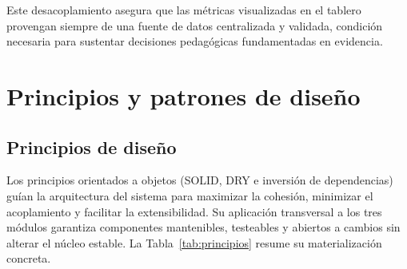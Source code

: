 Este desacoplamiento asegura que las métricas visualizadas en el tablero provengan
siempre de una fuente de datos centralizada y validada, condición necesaria para
sustentar decisiones pedagógicas fundamentadas en evidencia.

\section{Principios y patrones de diseño}

\subsection{Principios de diseño}

Los principios orientados a objetos (SOLID, DRY e inversión de dependencias) guían la arquitectura del sistema para maximizar la cohesión, minimizar el acoplamiento y facilitar la extensibilidad. Su aplicación transversal a los tres módulos garantiza componentes mantenibles, testeables y abiertos a cambios sin alterar el núcleo estable. La Tabla~\ref{tab:principios} resume su materialización concreta.

